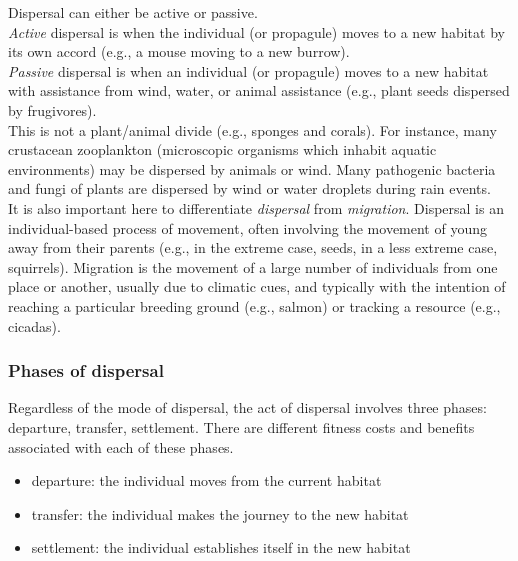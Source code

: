 \documentclass[12pt]{article}
\begin{document}
Dispersal can either be active or passive. \\

\textit{Active} dispersal is when the individual (or propagule) moves to a new habitat by its own accord (e.g., a mouse moving to a new burrow). \\

\textit{Passive} dispersal is when an individual (or propagule) moves to a new habitat with assistance from wind, water, or animal assistance (e.g., plant seeds dispersed by frugivores).\\

This is not a plant/animal divide (e.g., sponges and corals). For instance, many crustacean zooplankton (microscopic organisms which inhabit aquatic environments) may be dispersed by animals or wind. Many pathogenic bacteria and fungi of plants are dispersed by wind or water droplets during rain events. \\

It is also important here to differentiate \textit{dispersal} from \textit{migration}. Dispersal is an individual-based process of movement, often involving the movement of young away from their parents (e.g., in the extreme case, seeds, in a less extreme case, squirrels). Migration is the movement of a large number of individuals from one place or another, usually due to climatic cues, and typically with the intention of reaching a particular breeding ground (e.g., salmon) or tracking a resource (e.g., cicadas).











\subsubsection*{Phases of dispersal}

Regardless of the mode of dispersal, the act of dispersal involves three phases: departure, transfer, settlement. There are different fitness costs and benefits associated with each of these phases.

\begin{itemize}
  \item departure: the individual moves from the current habitat
  \item transfer: the individual makes the journey to the new habitat
  \item settlement: the individual establishes itself in the new habitat
\end{itemize}
\end{document}

